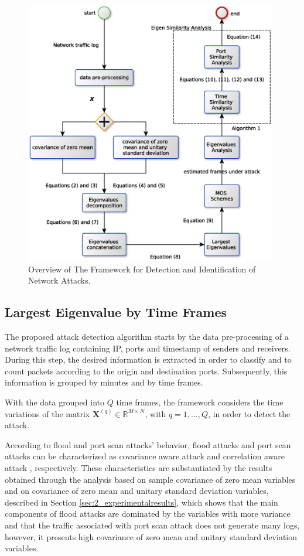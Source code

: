 \begin{figure}[h!]
	\centering
     \includegraphics[width=11cm]{figures/ch2/mos_eigen_similarity.eps}
     \caption{Overview of The Framework for Detection and Identification of Network Attacks.}
     \label{fig:2.08}
\end{figure}

\subsection{Largest Eigenvalue by Time Frames}
\label{sec:2_prop_LargestEigenvaluebyTimeFrames}

The proposed attack detection algorithm starts by the data pre-processing of a network traffic log containing IP, ports and timestamp of senders and receivers. During this step, the desired information is extracted in order to classify and to count packets according to the origin and destination ports. Subsequently, this information is grouped by minutes and by time frames.

With the data grouped into $Q$ time frames, the framework considers the time variations of the matrix $\pmb{X}^{(q)} \in \mathbb{R}^{M\times{N}}$, with $q = 1, \ldots, Q$, in order to detect the attack. 

According to flood and port scan attacks' behavior, flood attacks and port scan attacks can be characterized as covariance aware attack \citep{jin2004covariance} and correlation aware attack \citep{lakhina2005mining}, respectively. These characteristics are substantiated by the results obtained through the analysis based on sample covariance of zero mean variables and on covariance of zero mean and unitary standard deviation variables, described in Section \ref{sec:2_experimentalresults}, which shows that the main components of flood attacks are dominated by the variables with more variance and that the traffic associated with port scan attack does not generate many logs, however, it presents high covariance of zero mean and unitary standard deviation variables.

